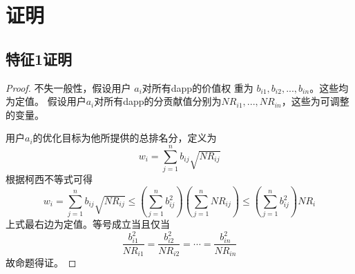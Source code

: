 \section{证明}
\subsection{特征1证明}
\begin{proof}
	
不失一般性，假设用户 $a_i$对所有dapp的价值权
重为 $b_{i1}, b_{i2}, ..., b_{in}$。这些均为定值。
假设用户$a_i$对所有dapp的分贡献值分别为$NR_{i1},...,NR_{in}$，这些为可调整的变量。

用户$a_i$的优化目标为他所提供的总排名分，定义为
$$w_i = \sum_{j=1}^n b_{ij}\sqrt{NR_{ij}}$$
根据柯西不等式可得
$$w_i = \sum_{j=1}^n b_{ij}\sqrt{NR_{ij}} \leq (\sum_{j=1}^n b_{ij}^2)(\sum_{j=1}^n NR_{ij}) \leq (\sum_{j=1}^n b_{ij}^2)NR_i$$
上式最右边为定值。等号成立当且仅当
$$\frac{b_{i1}^2}{NR_{i1}}=\frac{b_{i2}^2}{NR_{i2}}=\cdots=\frac{b_{in}^2}{NR_{in}}$$
故命题得证。

\end{proof}
